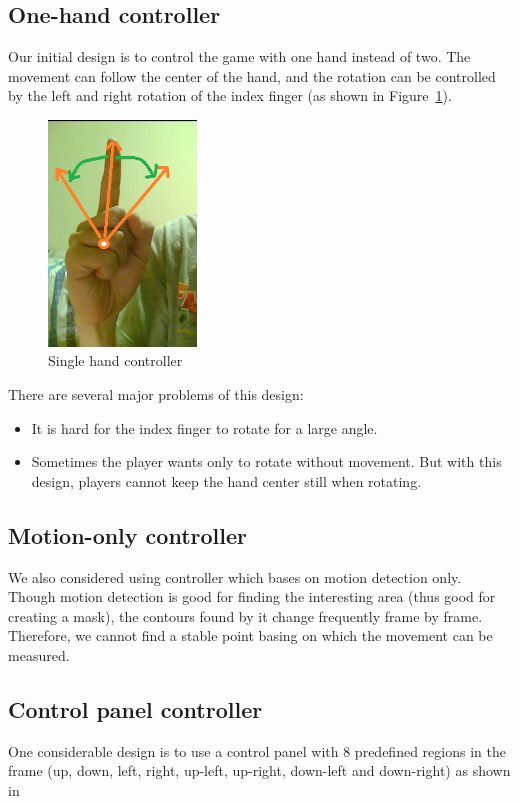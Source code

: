 \documentclass[10pt,twocolumn,letterpaper]{article}
\begin{document}
\subsection{One-hand controller}
Our initial design is to control the game with one hand instead of two. 
The movement can follow the center of the hand, and the rotation can be 
controlled by the left and right rotation of the index finger (as shown in 
Figure~\ref{fig:singlehand}).

\begin{figure}[h]
\centering
\includegraphics[height=6cm]{singlehand.png}
\caption{Single hand controller}
\label{fig:singlehand}
\end{figure}

There are several major problems of this design:
\begin{itemize}
	\item It is hard for the index finger to rotate for a large angle.
	\item Sometimes the player wants only to rotate without movement. 
	But with this design, players cannot keep the hand center still when rotating. 
\end{itemize}

\subsection{Motion-only controller}
We also considered using controller which bases on motion detection only. 
Though motion detection is good for finding the interesting area (thus good 
for creating a mask), the contours found by it change frequently frame by frame. 
Therefore, we cannot find a stable point basing on which the movement can be measured.

\subsection{Control panel controller}
One considerable design is to use a control panel with 8 predefined regions 
in the frame (up, down, left, right, up-left, up-right, down-left and down-right) 
as shown in 
\end{document}
